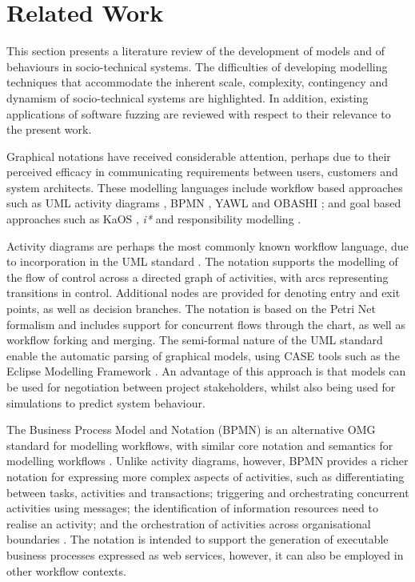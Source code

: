 \documentclass{sig-alternate}
\begin{document}

\section{Related Work}

\label{sec:related}


This section presents a literature review of the development of models and of behaviours in socio-technical systems.
The difficulties of developing modelling techniques that accommodate the inherent scale, complexity, contingency and
dynamism of socio-technical systems are highlighted.  In addition, existing applications of software fuzzing are
reviewed with respect to their relevance to the present work.

Graphical notations have received considerable attention, perhaps due to their perceived efficacy in communicating
requirements between users, customers and system architects.  These modelling languages include workflow based
approaches such as UML activity diagrams \citep{omg2010omguml}, BPMN \citep{omg2011omgbpmn}, YAWL
\citep{hofstede2010yawl} and OBASHI \cite{obashimethodology}; and goal based approaches such as KaOS
\citep{Werneck2009}, \emph{i*} \citep{yu1995} and responsibility modelling \citep{sommerville09responsibility}.

Activity diagrams are perhaps the most commonly known workflow language, due to incorporation in the UML standard
\citep{omg2010omguml}.  The notation supports the modelling of the flow of control across a directed graph of
activities, with arcs representing transitions in control.  Additional nodes are provided for denoting entry and exit
points, as well as decision branches.  The notation is based on the Petri Net formalism and includes support for
concurrent flows through the chart, as well as workflow forking and merging. The semi-formal nature of the UML standard
enable the automatic parsing of graphical models, using CASE tools such as the Eclipse Modelling Framework
\citep{EMFManual}.  An advantage of this approach is that models can be used for negotiation between project
stakeholders, whilst also being used for simulations to predict system behaviour.

The Business Process Model and Notation (BPMN) is an alternative OMG standard for modelling workflows, with similar core
notation and semantics for modelling workflows \citep{omg2011omgbpmn}.  Unlike activity diagrams, however, BPMN provides
a richer notation for expressing more complex aspects of activities, such as differentiating between tasks, activities
and transactions; triggering and orchestrating concurrent activities using messages; the identification of information
resources need to realise an activity; and the orchestration of activities across organisational boundaries
\citep{White2004}.  The notation is intended to support the generation of executable business processes expressed as web
services, however, it can also be employed in other workflow contexts.
\end{document}
